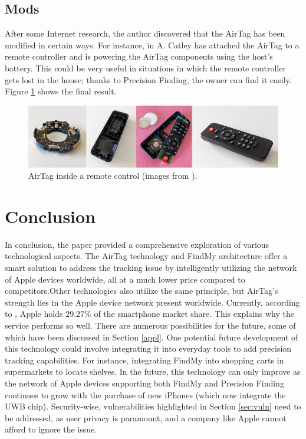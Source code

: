 \documentclass[english]{article}
\begin{document}
\subsection{Mods}
After some Internet research, the author discovered that the AirTag has been modified in certain ways. For instance, in \cite{telecomando} A. Catley has attached the AirTag to a remote controller and is powering the AirTag components using the host's battery. This could be very useful in situations in which the remote controller gets lost in the house; thanks to Precision Finding, the owner can find it easily. Figure \ref{img:controller} shows the final result.
\begin{figure}[]
	\centering
	\includegraphics[width=\textwidth]{images/remote.jpg}
	\caption{AirTag inside a remote control (images from \cite{reverse}).}
	\label{img:controller}
\end{figure}


\section{Conclusion}
In conclusion, the paper provided a comprehensive exploration of various technological aspects. The AirTag technology and FindMy architecture offer a smart solution to address the tracking issue by intelligently utilizing the network of Apple devices worldwide, all at a much lower price compared to competitors.Other technologies also utilize the same principle, but AirTag's strength lies in the Apple device network present worldwide. Currently, according to \cite{Lin}, Apple holds $29.27\%$ of the smartphone market share. This explains why the service performs so well. There are numerous possibilities for the future, some of which have been discussed in Section \ref{appl}. One potential future development of this technology could involve integrating it into everyday tools to add precision tracking capabilities. For instance, integrating FindMy into shopping carts in supermarkets to locate shelves. In the future, this technology can only improve as the network of Apple devices supporting both FindMy and Precision Finding continues to grow with the purchase of new iPhones (which now integrate the UWB chip). Security-wise, vulnerabilities highlighted in Section \ref{sec:vuln} need to be addressed, as user privacy is paramount, and a company like Apple cannot afford to ignore the issue.
\printbibliography
\nocite{*}
\end{document}
